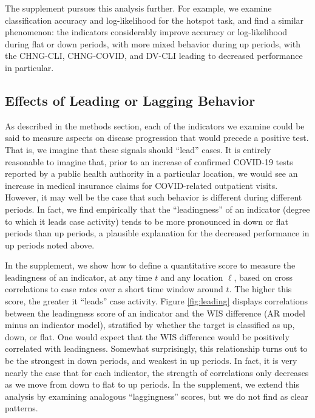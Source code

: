 \documentclass[9pt,twocolumn,twoside,lineno]{pnas-new}
\begin{document}
The supplement pursues this analysis further.  For example, we examine
classification accuracy and log-likelihood for the hotspot task, and find a
similar phenomenon: the indicators considerably improve accuracy or
log-likelihood during flat or down periods, with more mixed behavior during up
periods, with the CHNG-CLI, CHNG-COVID, and DV-CLI leading to decreased
performance in particular.



\subsection{Effects of Leading or Lagging Behavior}

As described in the methods section, each of the indicators we examine could be
said to measure aspects on disease progression that would precede a positive
test. That is, we imagine that these signals should ``lead'' cases. It is
entirely reasonable to imagine that, prior to an increase of confirmed COVID-19
tests reported by a public health authority in a particular location, we would
see an increase in medical insurance claims for COVID-related outpatient
visits. However, it may well be the case that such behavior is different
during different periods. In fact, we find empirically that the ``leadingness''
of an indicator (degree to which it leads case activity) tends to be more
pronounced in down or flat periods than up periods, a plausible explanation
for the decreased performance in up periods noted above.

In the supplement, we show how to define a quantitative score to measure the
leadingness of an indicator, at any time $t$ and any location $\ell$, based on
cross correlations to case rates over a short time window around $t$.
The higher this score, the greater it ``leads'' case activity.  Figure 
\ref{fig:leading} displays correlations between the leadingness score of an 
indicator and the WIS difference (AR model minus an indicator model), stratified
by whether the target is classified as up, down, or flat.  One would expect that  
the WIS difference would be positively correlated with leadingness.  Somewhat
surprisingly, this relationship turns out to be the strongest in down periods,
and weakest in up periods.  In fact, it is very nearly the case that for each
indicator, the strength of correlations only decreases as we move from down to
flat to up  periods.  In the supplement, we extend this analysis by examining
analogous ``laggingness'' scores, but we do not find as clear patterns. 
\end{document}

